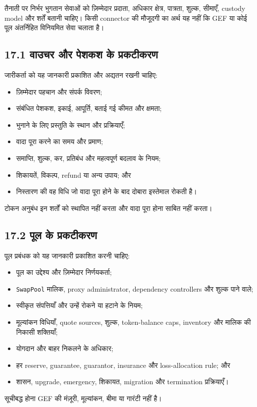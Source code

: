 \documentclass[11pt]{article}
\begin{document}
तैनाती पर निर्भर भुगतान सेवाओं को ज़िम्मेदार प्रदाता, अधिकार क्षेत्र, पात्रता, शुल्क, सीमाएँ, custody model और शर्तें बतानी चाहिए। किसी connector की मौजूदगी का अर्थ यह नहीं कि GEF या कोई पूल अंतर्निहित विनियमित सेवा चलाता है।

\subsection*{17.1 वाउचर और पेशकश के प्रकटीकरण}

जारीकर्ता को यह जानकारी प्रकाशित और अद्यतन रखनी चाहिए:

\begin{itemize}[leftmargin=*]
\item ज़िम्मेदार पहचान और संपर्क विवरण;
\item संबंधित पेशकश, इकाई, आपूर्ति, बताई गई कीमत और क्षमता;
\item भुनाने के लिए प्रस्तुति के स्थान और प्रक्रियाएँ;
\item वादा पूरा करने का समय और प्रमाण;
\item समाप्ति, शुल्क, कर, प्रतिबंध और महत्वपूर्ण बदलाव के नियम;
\item शिकायतें, विकल्प, refund या अन्य उपाय; और
\item निस्तारण की वह विधि जो वादा पूरा होने के बाद दोबारा इस्तेमाल रोकती है।
\end{itemize}
टोकन अनुबंध इन शर्तों को स्थापित नहीं करता और वादा पूरा होना साबित नहीं करता।

\subsection*{17.2 पूल के प्रकटीकरण}

पूल प्रबंधक को यह जानकारी प्रकाशित करनी चाहिए:

\begin{itemize}[leftmargin=*]
\item पूल का उद्देश्य और ज़िम्मेदार निर्णयकर्ता;
\item \texttt{SwapPool} मालिक, proxy administrator, dependency controllers और शुल्क पाने वाले;
\item स्वीकृत संपत्तियाँ और उन्हें रोकने या हटाने के नियम;
\item मूल्यांकन विधियाँ, quote sources, शुल्क, token-balance caps, inventory और मालिक की निकासी शक्तियाँ;
\item योगदान और बाहर निकलने के अधिकार;
\item हर reserve, guarantee, guarantor, insurance और loss-allocation rule; और
\item शासन, upgrade, emergency, शिकायत, migration और termination प्रक्रियाएँ।
\end{itemize}
सूचीबद्ध होना GEF की मंज़ूरी, मूल्यांकन, बीमा या गारंटी नहीं है।
\end{document}
